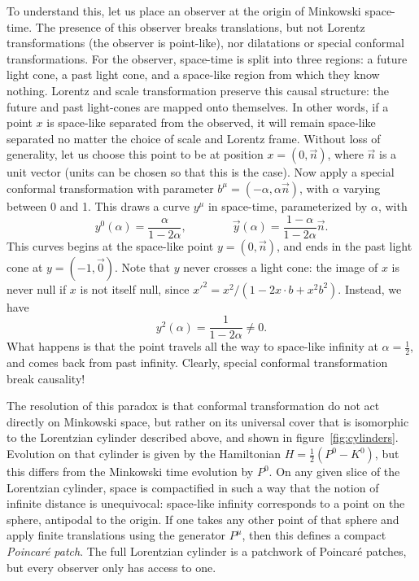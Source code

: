 \documentclass[a4paper,12pt]{article}
\numberwithin{equation}{section}
\begin{document}
To understand this, let us place an observer at the origin of Minkowski space-time. The presence of this observer breaks translations, but not Lorentz transformations (the observer is point-like), nor dilatations or special conformal transformations. For the observer, space-time is split into three regions: a future light cone, a past light cone, and a   space-like region from which they know nothing.
Lorentz and scale transformation preserve this causal structure: the future and past light-cones are mapped onto themselves. In other words, if a point $x$ is space-like separated from the observed, it will remain space-like separated no matter the choice of scale and Lorentz frame. Without loss of generality, let us choose this point to be at position $x = (0, \vec{n})$, where $\vec{n}$ is a unit vector (units can be chosen so that this is the case).
Now apply a special conformal transformation with parameter $b^\mu = (-\alpha, \alpha \vec{n})$, with $\alpha$ varying between 0 and 1.
This draws a curve $y^\mu $ in space-time, parameterized by $\alpha$,
with
\begin{equation}
	y^0(\alpha) = \frac{\alpha}{1 - 2 \alpha},
	\qquad\qquad
	\vec{y}(\alpha) = \frac{1 - \alpha}{1 - 2 \alpha} \vec{n}.
\end{equation}
This curves begins at the space-like point $y = (0, \vec{n})$, and ends in the past light cone at $y = (-1, \vec{0})$.
Note that $y$ never crosses a light cone: the image of $x$ is never null if $x$ is not itself null, since $x'^2 = x^2 / (1 - 2 x \cdot b + x^2 b^2)$.
Instead, we have
\begin{equation}
	y^2(\alpha) = \frac{1}{1 - 2\alpha} \neq 0.
\end{equation}
What happens is that the point travels all the way to space-like infinity at $\alpha = \frac{1}{2}$, and comes back from past infinity.
Clearly, special conformal transformation break causality!

The resolution of this paradox is that conformal transformation do not act directly on Minkowski space, but rather on its universal cover that is isomorphic to the Lorentzian cylinder described above, and shown in figure~\ref{fig:cylinders}.
Evolution on that cylinder is given by the Hamiltonian $H = \frac{1}{2} (P^0 - K^0)$, but this differs from the Minkowski time evolution by $P^0$. On any given slice of the Lorentzian cylinder, space is compactified in such a way that the notion of infinite distance is unequivocal: space-like infinity corresponds to a point on the sphere, antipodal to the origin. If one takes any other point of that sphere and apply finite translations using the generator $P^\mu$, then this defines a compact \emph{Poincaré patch}. The full Lorentzian cylinder is a patchwork of Poincaré patches, but every observer only has access to one.
\end{document}
